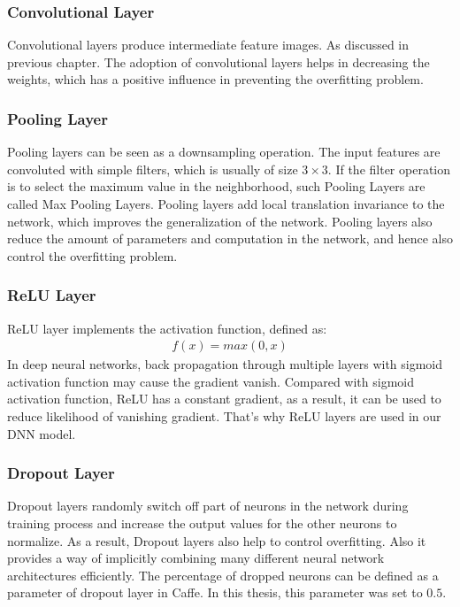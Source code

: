 \subsubsection{Convolutional Layer}
Convolutional layers produce intermediate feature images. As discussed in previous chapter. The adoption of convolutional layers helps in decreasing the weights, which has a positive influence in preventing the overfitting problem. 

\subsubsection{Pooling Layer}
Pooling layers can be seen as a downsampling operation. The input features are convoluted with simple filters, which is usually of size $3\times3$. If the filter operation is to select the maximum value in the neighborhood, such Pooling Layers are called Max Pooling Layers. Pooling layers
add local translation invariance to the network, which improves the generalization of the network\cite{hinton2012improving}. Pooling layers also reduce the amount of parameters and computation in the network, and hence also control the overfitting problem. 
\subsubsection{ReLU Layer}
ReLU layer implements the activation function, defined as:
\begin{align}
f(x) = max(0,x)
\end{align}
In deep neural networks, back propagation through multiple layers with sigmoid activation function may cause the gradient vanish. Compared with sigmoid activation function, ReLU has a constant gradient, as a result, it can be used to reduce likelihood of vanishing gradient. That's why ReLU layers are used in our DNN model.\cite{nair2010rectified}
\subsubsection{Dropout Layer}
Dropout layers randomly switch off part of neurons in the network during training process and increase the output values for the other neurons to normalize. As a result, Dropout layers also help to control overfitting.  Also it
provides a way of implicitly combining many different neural network architectures efficiently\cite{srivastava2014dropout}. The percentage of dropped neurons can be defined as a parameter of dropout layer in Caffe. In this thesis, this parameter was set to $0.5$. 
